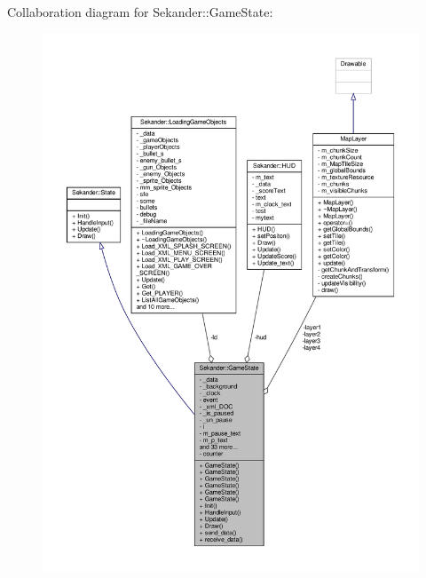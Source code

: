 Collaboration diagram for Sekander\+:\+:Game\+State\+:
\nopagebreak
\begin{figure}[H]
\begin{center}
\leavevmode
\includegraphics[width=350pt]{classSekander_1_1GameState__coll__graph}
\end{center}
\end{figure}
